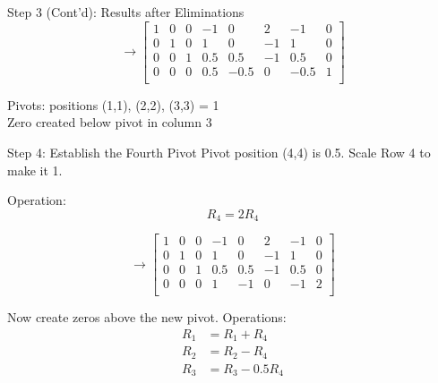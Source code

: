 \documentclass[aspectratio=169,xcolor=dvipsnames,svgnames,x11names,fleqn]{beamer}
\begin{document}
\begin{frame}{Step 3 (Cont'd): Results after Eliminations}
            \footnotesize
\centering
$$
\rightarrow \left[\begin{array}{cccc|cccc}
1 & 0 & 0 & -1 & 0 & 2 & -1 & 0 \\
0 & 1 & 0 & 1 & 0 & -1 & 1 & 0 \\
0 & 0 & 1 & 0.5 & 0.5 & -1 & 0.5 & 0 \\
0 & 0 & 0 & 0.5 & -0.5 & 0 & -0.5 & 1 \\
\end{array}\right]
$$

\vspace{3mm}
\colorbox{red!20}{Pivots: positions (1,1), (2,2), (3,3) = 1} \\
\colorbox{blue!20}{Zero created below pivot in column 3}
\end{frame}

\begin{frame}{Step 4: Establish the Fourth Pivot}
            \footnotesize
\centering
Pivot position (4,4) is \alert{0.5}. Scale Row 4 to make it \alert{1}.

\vspace{3mm}
Operation:
$$
R_4 = 2 R_4
$$

\vspace{3mm}
$$
\rightarrow \left[\begin{array}{cccc|cccc}
1 & 0 & 0 & -1 & 0 & 2 & -1 & 0 \\
0 & 1 & 0 & 1 & 0 & -1 & 1 & 0 \\
0 & 0 & 1 & 0.5 & 0.5 & -1 & 0.5 & 0 \\
0 & 0 & 0 & 1 & -1 & 0 & -1 & 2 \\
\end{array}\right]
$$

\vspace{3mm}
Now create zeros above the new pivot.
\vspace{3mm}
Operations:
\begin{align*}
R_1 &= R_1 + R_4 \\
R_2 &= R_2 - R_4 \\
R_3 &= R_3 - 0.5R_4
\end{align*}
\end{frame}
\end{document}
